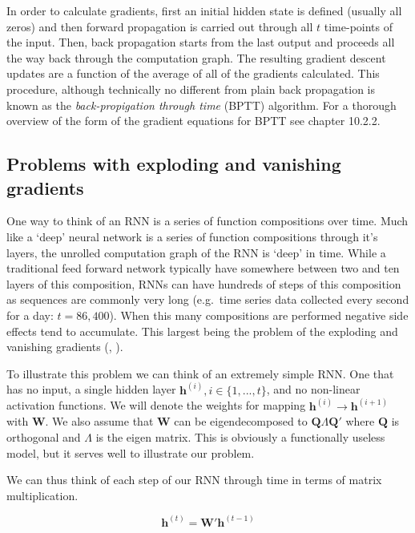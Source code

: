 \documentclass[]{book}
\theoremstyle{definition}
\theoremstyle{definition}
\theoremstyle{definition}
\theoremstyle{remark}
\begin{document}
In order to calculate gradients, first an initial hidden state is
defined (usually all zeros) and then forward propagation is carried out
through all \(t\) time-points of the input. Then, back propagation
starts from the last output and proceeds all the way back through the
computation graph. The resulting gradient descent updates are a function
of the average of all of the gradients calculated. This procedure,
although technically no different from plain back propagation is known
as the \emph{back-propigation through time} (BPTT) algorithm. For a
thorough overview of the form of the gradient equations for BPTT see
\citet{goodfellow_DL} chapter 10.2.2.

\subsection{Problems with exploding and vanishing
gradients}\label{problems-with-exploding-and-vanishing-gradients}

One way to think of an RNN is a series of function compositions over
time. Much like a `deep' neural network is a series of function
compositions through it's layers, the unrolled computation graph of the
RNN is `deep' in time. While a traditional feed forward network
typically have somewhere between two and ten layers of this composition,
RNNs can have hundreds of steps of this composition as sequences are
commonly very long (e.g.~time series data collected every second for a
day: \(t= 86,400\)). When this many compositions are performed negative
side effects tend to accumulate. This largest being the problem of the
exploding and vanishing gradients (\citet{vanishing_gradient},
\citet{bengio_gradient}).

To illustrate this problem we can think of an extremely simple RNN. One
that has no input, a single hidden layer
\(\textbf{h}^{(i)}, i \in \{1, ..., t\}\), and no non-linear activation
functions. We will denote the weights for mapping
\(\textbf{h}^{(i)} \to \textbf{h}^{(i + 1)}\) with \(\textbf{W}\). We
also assume that \(\textbf{W}\) can be eigendecomposed to
\(\textbf{Q}\Lambda\textbf{Q}'\) where \(\textbf{Q}\) is orthogonal and
\(\Lambda\) is the eigen matrix. This is obviously a functionally
useless model, but it serves well to illustrate our problem.

We can thus think of each step of our RNN through time in terms of
matrix multiplication.

\begin{equation} 
  \textbf{h}^{(t)} = \textbf{W}' \textbf{h}^{(t - 1)}
  \label{eq:simplernn1}
\end{equation}
\end{document}
